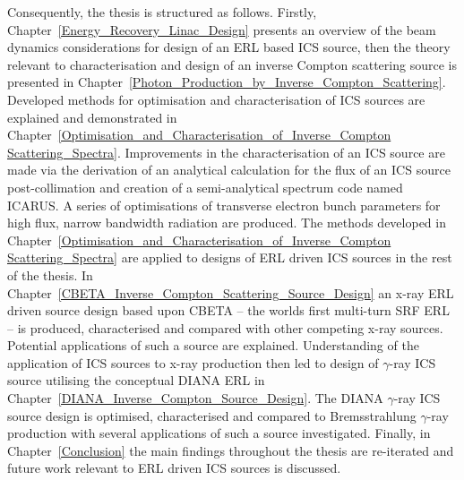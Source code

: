\documentclass[../main.tex]{subfiles}
\begin{document}
Consequently, the thesis is structured as follows. Firstly,  Chapter~\ref{Energy_Recovery_Linac_Design} presents an overview of the beam dynamics considerations for design of an ERL based ICS source, then the theory relevant to characterisation and design of an inverse Compton scattering source is presented in Chapter~\ref{Photon_Production_by_Inverse_Compton_Scattering}. Developed methods for optimisation and characterisation of ICS sources are explained and demonstrated in Chapter~\ref{Optimisation_and_Characterisation_of_Inverse_Compton Scattering_Spectra}. Improvements in the characterisation of an ICS source are made via the derivation of an analytical calculation for the flux of an ICS source post-collimation and creation of a semi-analytical spectrum code named \textsc{ICARUS}. A series of optimisations of transverse electron bunch parameters for high flux, narrow bandwidth radiation are produced. The methods developed in Chapter~\ref{Optimisation_and_Characterisation_of_Inverse_Compton Scattering_Spectra} are applied to designs of ERL driven ICS sources in the rest of the thesis. In Chapter~\ref{CBETA_Inverse_Compton_Scattering_Source_Design} an x-ray ERL driven source design based upon CBETA -- the worlds first multi-turn SRF ERL -- is produced, characterised and compared with other competing x-ray sources. Potential applications of such a source are explained. Understanding of the application of ICS sources to x-ray production then led to design of $\gamma$-ray ICS source utilising the conceptual DIANA ERL in Chapter~\ref{DIANA_Inverse_Compton_Source_Design}. The DIANA $\gamma$-ray ICS source design is optimised, characterised and compared to Bremsstrahlung $\gamma$-ray production with several applications of such a source investigated. Finally, in Chapter~\ref{Conclusion} the main findings throughout the thesis are re-iterated and future work relevant to ERL driven ICS sources is discussed.       
\end{document}
